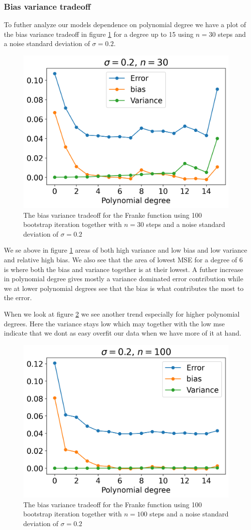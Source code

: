 \documentclass[12pt]{article}
\begin{document}
\subsubsection{Bias variance tradeoff}

To futher analyze our models dependence on polynomial degree we have a plot of the bias variance tradeoff in figure \ref{fig:bias_variance} for a degree up to 15 using $n=30$ steps and a noise standard deviation of $\sigma=0.2$.
\begin{figure}[H]
  \centering
  \includegraphics[width=.7\textwidth]{../figures/bias_variance_tradeoff.png}
  \caption{The bias variance tradeoff for the Franke function using 100 bootstrap iteration together with $n=30$ steps and a noise standard deviation of $\sigma=0.2$}
  \label{fig:bias_variance}
\end{figure}
We se above in figure \ref{fig:bias_variance} areas of both high variance and low bias and low variance and relative high bias. We also see that the area of lowest MSE for a degree of 6 is where both the bias and variance together is at their lowest. A futher increase in polynomial degree gives mostly a variance dominated error contribution while we at lower polynomial degrees see that the bias is what contributes the most to the error.

When we look at figure \ref{fig:bias_variance_100} we see another trend especially for higher polynomial degrees. Here the variance stays low which may together with the low mse indicate that we dont as easy overfit our data when we have more of it at hand.
\begin{figure}[H]
  \centering
  \includegraphics[width=.7\textwidth]{../figures/bias_variance_100.png}
  \caption{The bias variance tradeoff for the Franke function using 100 bootstrap iteration together with $n=100$ steps and a noise standard deviation of $\sigma=0.2$}
  \label{fig:bias_variance_100}
\end{figure}
\end{document}
